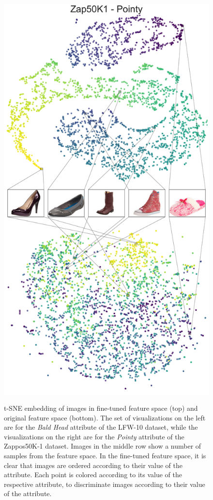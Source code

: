 \documentclass[runningheads]{llncs}
\begin{document}
\begin{figure}
{\includegraphics{zappos-pointy-featspace-new.pdf}
}
\caption{t-SNE embedding of images in fine-tuned feature space (top) and original feature space (bottom). The set of visualizations on the left are for the \textit{Bald Head} attribute of the LFW-10 dataset, while the visualizations on the right are for the \textit{Pointy} attribute of the Zappos50K-1 dataset. Images in the middle row show a number of samples from the feature space. In the fine-tuned feature space, it is clear that images are ordered according to their value of the attribute. Each point is colored according to its value of the respective attribute, to discriminate images according to their value of the attribute.}
\label{featspace}
\end{figure}
\end{document}
